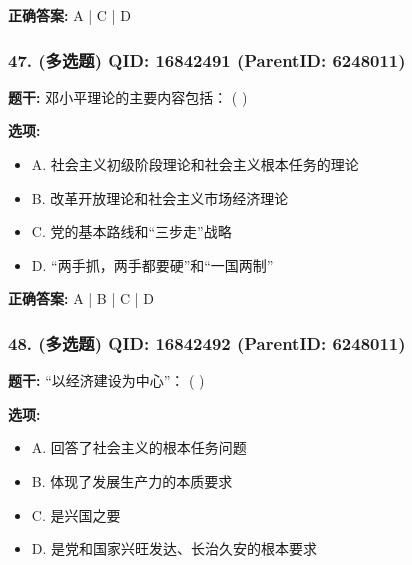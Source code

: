 \documentclass[12pt,UTF8]{ctexart}
\begin{document}
\textbf{正确答案:}
A | C | D

\vspace{0.3em}\hrulefill\vspace{0.7em}

\subsubsection*{47. (多选题) \small QID: 16842491 (ParentID: 6248011)}

\textbf{题干:}
邓小平理论的主要内容包括： ( )



\textbf{选项:}
\begin{itemize}[leftmargin=*]

  \item A. 社会主义初级阶段理论和社会主义根本任务的理论

  \item B. 改革开放理论和社会主义市场经济理论

  \item C. 党的基本路线和“三步走”战略

  \item D. “两手抓，两手都要硬”和“一国两制”

\end{itemize}

\textbf{正确答案:}
A | B | C | D

\vspace{0.3em}\hrulefill\vspace{0.7em}

\subsubsection*{48. (多选题) \small QID: 16842492 (ParentID: 6248011)}

\textbf{题干:}
“以经济建设为中心”： ( )



\textbf{选项:}
\begin{itemize}[leftmargin=*]

  \item A. 回答了社会主义的根本任务问题

  \item B. 体现了发展生产力的本质要求

  \item C. 是兴国之要

  \item D. 是党和国家兴旺发达、长治久安的根本要求

\end{itemize}
\end{document}
